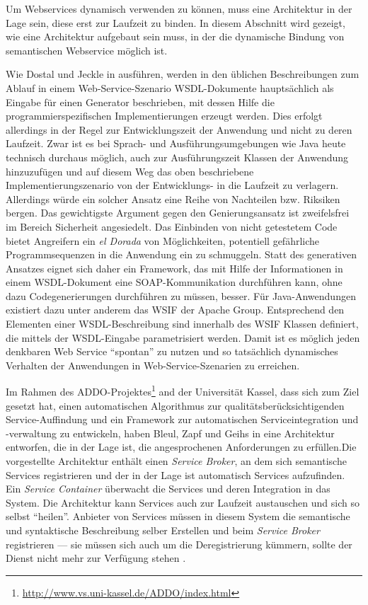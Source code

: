 Um Webservices dynamisch verwenden zu können, muss eine Architektur in der Lage sein, diese erst zur Laufzeit zu binden. In diesem Abschnitt wird gezeigt, wie eine Architektur aufgebaut sein muss, in der die dynamische Bindung von semantischen Webservice möglich ist.

\bigskip

Wie Dostal und Jeckle in \cite[S.61]{xmlspek4} ausführen, werden in den üblichen Beschreibungen zum Ablauf in einem Web-Service-Szenario \ac{WSDL}-Dokumente hauptsächlich als Eingabe für einen Generator beschrieben, mit dessen Hilfe die programmierspezifischen Implementierungen erzeugt werden. Dies erfolgt allerdings in der Regel zur Entwicklungszeit der Anwendung und nicht zu deren Laufzeit. Zwar ist es bei Sprach- und Ausführungsumgebungen wie Java heute technisch durchaus möglich, auch zur Ausführungszeit Klassen der Anwendung hinzuzufügen und auf diesem Weg das oben beschriebene Implementierungszenario von der Entwicklungs- in die Laufzeit zu verlagern. Allerdings würde ein solcher Ansatz eine Reihe von Nachteilen bzw. Riksiken bergen. Das gewichtigste Argument gegen den Genierungsansatz ist zweifelsfrei im Bereich Sicherheit angesiedelt. Das Einbinden von nicht getestetem Code bietet Angreifern ein \emph{el Dorada} von Möglichkeiten, potentiell gefährliche Programmsequenzen in die Anwendung ein zu schmuggeln. Statt des generativen Ansatzes eignet sich daher ein Framework, das mit Hilfe der Informationen in einem \ac{WSDL}-Dokument eine \ac{SOAP}-Kommunikation durchführen kann, ohne dazu Codegenerierungen durchführen zu müssen, besser. Für Java-Anwendungen existiert dazu unter anderem das \ac{WSIF} der Apache Group. Entsprechend den Elementen einer WSDL-Beschreibung sind innerhalb des \ac{WSIF} Klassen definiert, die mittels der \ac{WSDL}-Eingabe parametrisiert werden. Damit ist es möglich jeden denkbaren Web Service "`spontan"' zu nutzen und so tatsächlich dynamisches Verhalten der Anwendungen in Web-Service-Szenarien zu erreichen. 

Im Rahmen des \ac{ADDO}-Projektes\footnote{\url{http://www.vs.uni-kassel.de/ADDO/index.html}} and der Universität Kassel, dass sich zum Ziel gesetzt hat, einen automatischen Algorithmus zur qualitätsberücksichtigenden Service-Auffindung und ein Framework zur automatischen Serviceintegration und -verwaltung zu entwickeln, haben Bleul, Zapf und Geihs in \cite[S.410ff]{flexbrok} eine Architektur entworfen, die in der Lage ist, die angesprochenen Anforderungen zu erfüllen.Die vorgestellte Architektur enthält einen \emph{Service Broker}, an dem sich semantische Services registrieren und der in der Lage ist automatisch Services aufzufinden. Ein \emph{Service Container} überwacht die Services und deren Integration in das System. Die Architektur kann Services auch zur Laufzeit austauschen und sich so selbst "`heilen"'. Anbieter von Services müssen in diesem System die semantische und syntaktische Beschreibung selber Erstellen und beim \emph{Service Broker} registrieren --- sie müssen sich auch um die Deregistrierung kümmern, sollte der Dienst nicht mehr zur Verfügung stehen \cite[S.416]{flexbrok}.

